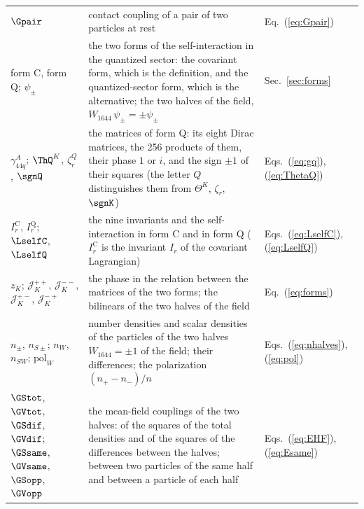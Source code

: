 \begin{table}
\begin{ruledtabular}
\begin{tabular}{p{}p{}p{}}
$\Gpair$ & contact coupling of a pair of two particles at rest & Eq.~(\ref{eq:Gpair}) \\
form C, form Q; $\psi_\pm$ & the two forms of the self-interaction in the quantized sector: the covariant form, which is the definition, and the quantized-sector form, which is the alternative; the two halves of the field, $W_{1644}\,\psi_\pm=\pm\psi_\pm$ & Sec.~\ref{sec:forms} \\
$\gamma_{44q}^{A}$; $\ThQ^{K}$, $\zeta_r^{Q}$, $\sgnQ$ & the matrices of form Q: its eight Dirac matrices, the 256 products of them, their phase $1$ or $i$, and the sign $\pm1$ of their squares (the letter $Q$ distinguishes them from $\Theta^{K}$, $\zeta_r$, $\sgnK$) & Eqs.~(\ref{eq:gq}), (\ref{eq:ThetaQ}) \\
$I_r^{\mathrm C}$, $I_r^{\mathrm Q}$; $\LselfC$, $\LselfQ$ & the nine invariants and the self-interaction in form C and in form Q ($I_r^{\mathrm C}$ is the invariant $I_r$ of the covariant Lagrangian) & Eqs.~(\ref{eq:LselfC}), (\ref{eq:LselfQ}) \\
$z_K$; $\mathcal J_K^{++}$, $\mathcal J_K^{--}$, $\mathcal J_K^{+-}$, $\mathcal J_K^{-+}$ & the phase in the relation between the matrices of the two forms; the bilinears of the two halves of the field & Eq.~(\ref{eq:forms}) \\
$n_\pm$, $n_{S\pm}$; $n_W$, $n_{SW}$; $\mathrm{pol}_W$ & number densities and scalar densities of the particles of the two halves $W_{1644}=\pm1$ of the field; their differences; the polarization $(n_+-n_-)/n$ & Eqs.~(\ref{eq:nhalves}), (\ref{eq:pol}) \\
$\GStot$, $\GVtot$, $\GSdif$, $\GVdif$; $\GSsame$, $\GVsame$, $\GSopp$, $\GVopp$ & the mean-field couplings of the two halves: of the squares of the total densities and of the squares of the differences between the halves; between two particles of the same half and between a particle of each half & Eqs.~(\ref{eq:EHF}), (\ref{eq:Esame}) \\
\end{tabular}
\end{ruledtabular}
\end{table}

